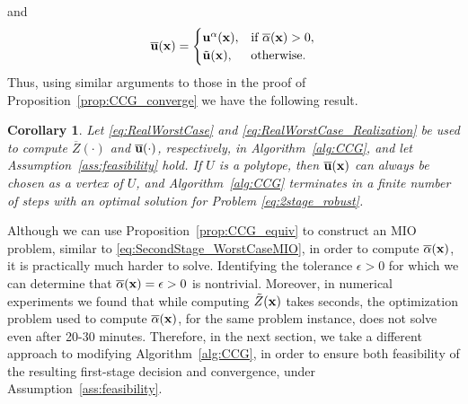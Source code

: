 \documentclass[12pt,x11names]{article}
\newtheorem{corollary}{Corollary} %
\theoremstyle{definition}
\newcommand{\bu}{{\bf u}}
\newcommand{\bx}{{\bf x}}
\begin{document}
and 
\begin{equation}\label{eq:RealWorstCase_Realization}\overline{\bu}(\bx)=\begin{cases}
{\bu}^\alpha(\bx), & \text{if } \overline{\alpha}(\bx)>0,\\
\tilde{\bu}(\bx), & \text{otherwise}.
\end{cases}\end{equation} 
Thus, using similar arguments to those in the proof of Proposition~\ref{prop:CCG_converge} we have the following result.
\begin{corollary}
Let \eqref{eq:RealWorstCase} and \eqref{eq:RealWorstCase_Realization} be used to compute $\overline{Z}(\cdot)$ and $\overline{\bu}(\cdot)$, respectively, in Algorithm~\ref{alg:CCG}, and let Assumption~\ref{ass:feasibility} hold. %
If $U$ is a polytope, then $\overline{\bu}(\bx)$ can always be chosen as a vertex of $U$, and Algorithm~\ref{alg:CCG} terminates in a finite number of steps with an optimal solution for Problem \eqref{eq:2stage_robust}.
\end{corollary}

Although we can use Proposition~\ref{prop:CCG_equiv} to construct an MIO problem, similar to \eqref{eq:SecondStage_WorstCaseMIO}, in order to compute $\overline{\alpha}(\bx)$, it is practically much harder to solve. Identifying the tolerance $\epsilon>0$ for which we can determine that $\overline{\alpha}(\bx)=\epsilon>0$ is nontrivial. Moreover, in numerical experiments we found that while computing $\tilde{Z}(\bx)$ takes seconds, the optimization problem used to compute $\overline{\alpha}(\bx)$, for the same problem instance, does not solve even after 20-30 minutes. Therefore, in the next section, we take a different approach to modifying Algorithm~\ref{alg:CCG}, in order to ensure both feasibility of the resulting first-stage decision and convergence, under Assumption~\ref{ass:feasibility}.
\end{document}

